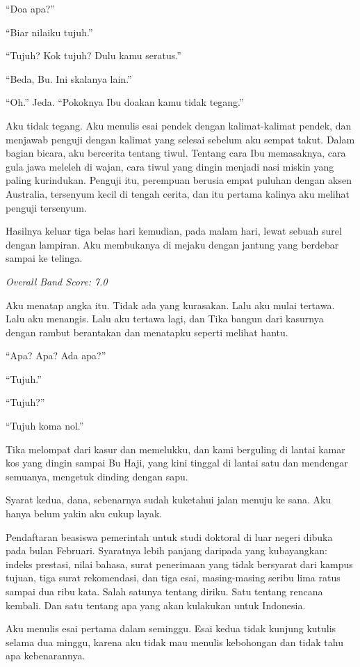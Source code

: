 \documentclass[11pt,twoside,openany]{book}
\makeatletter
\newcommand{\scenebreak}{\par\vspace{0.9em}{\centering\textsc{*\hspace{0.7em}*\hspace{0.7em}*}\par}\vspace{0.9em}\@afterindentfalse\@afterheading}
\makeatother
\begin{document}
``Doa apa?''

``Biar nilaiku tujuh.''

``Tujuh? Kok tujuh? Dulu kamu seratus.''

``Beda, Bu. Ini skalanya lain.''

``Oh.'' Jeda. ``Pokoknya Ibu doakan kamu tidak tegang.''

Aku tidak tegang. Aku menulis esai pendek dengan kalimat-kalimat pendek, dan menjawab penguji dengan kalimat yang selesai sebelum aku sempat takut. Dalam bagian bicara, aku bercerita tentang tiwul. Tentang cara Ibu memasaknya, cara gula jawa meleleh di wajan, cara tiwul yang dingin menjadi nasi miskin yang paling kurindukan. Penguji itu, perempuan berusia empat puluhan dengan aksen Australia, tersenyum kecil di tengah cerita, dan itu pertama kalinya aku melihat penguji tersenyum.

Hasilnya keluar tiga belas hari kemudian, pada malam hari, lewat sebuah surel dengan lampiran. Aku membukanya di mejaku dengan jantung yang berdebar sampai ke telinga.

\emph{Overall Band Score: 7.0}

Aku menatap angka itu. Tidak ada yang kurasakan. Lalu aku mulai tertawa. Lalu aku menangis. Lalu aku tertawa lagi, dan Tika bangun dari kasurnya dengan rambut berantakan dan menatapku seperti melihat hantu.

``Apa? Apa? Ada apa?''

``Tujuh.''

``Tujuh?''

``Tujuh koma nol.''

Tika melompat dari kasur dan memelukku, dan kami berguling di lantai kamar kos yang dingin sampai Bu Haji, yang kini tinggal di lantai satu dan mendengar semuanya, mengetuk dinding dengan sapu.

\scenebreak
Syarat kedua, dana, sebenarnya sudah kuketahui jalan menuju ke sana. Aku hanya belum yakin aku cukup layak.

Pendaftaran beasiswa pemerintah untuk studi doktoral di luar negeri dibuka pada bulan Februari. Syaratnya lebih panjang daripada yang kubayangkan: indeks prestasi, nilai bahasa, surat penerimaan yang tidak bersyarat dari kampus tujuan, tiga surat rekomendasi, dan tiga esai, masing-masing seribu lima ratus sampai dua ribu kata. Salah satunya tentang diriku. Satu tentang rencana kembali. Dan satu tentang apa yang akan kulakukan untuk Indonesia.

Aku menulis esai pertama dalam seminggu. Esai kedua tidak kunjung kutulis selama dua minggu, karena aku tidak mau menulis kebohongan dan tidak tahu apa kebenarannya.
\end{document}
